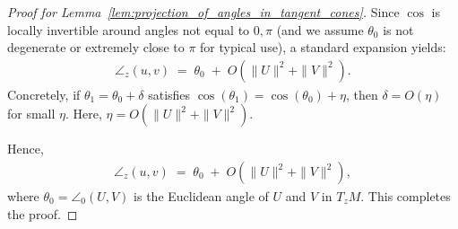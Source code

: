 \begin{proof}[Proof for Lemma~\ref{lem:projection_of_angles_in_tangent_cones}]
    Since \(\cos\) is locally invertible around angles not equal to \(0,\pi\) (and we assume \(\theta_0\) is not degenerate or extremely close to \(\pi\) for typical use), a standard expansion yields:
    \begin{align*}
        \angle_z(u,v)
        \;=\;
        \theta_0 
        \;+\;
        O(\|U\|^2 + \|V\|^2).
    \end{align*}
    Concretely, if \(\theta_1=\theta_0+\delta\) satisfies \(\cos(\theta_1)=\cos(\theta_0)+\eta\), then \(\delta=O(\eta)\) for small \(\eta\). Here, \(\eta = O(\|U\|^2 + \|V\|^2)\).  

    Hence,
    \begin{align*}
        \angle_z(u,v)
        \;=\;
        \theta_0
        \;+\;
        O(\|U\|^2 + \|V\|^2),
    \end{align*}
    where \(\theta_0 = \angle_0(U,V)\) is the Euclidean angle of \(U\) and \(V\) in \(T_zM\).
    This completes the proof.
\end{proof}

